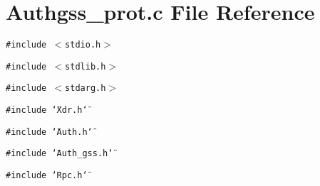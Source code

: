 \section{Authgss\_\-prot.c File Reference}
\label{Authgss__prot_8c}
{\tt \#include $<$stdio.h$>$}\par
{\tt \#include $<$stdlib.h$>$}\par
{\tt \#include $<$stdarg.h$>$}\par
{\tt \#include \char`\"{}Xdr.h\char`\"{}}\par
{\tt \#include \char`\"{}Auth.h\char`\"{}}\par
{\tt \#include \char`\"{}Auth\_\-gss.h\char`\"{}}\par
{\tt \#include \char`\"{}Rpc.h\char`\"{}}\par
